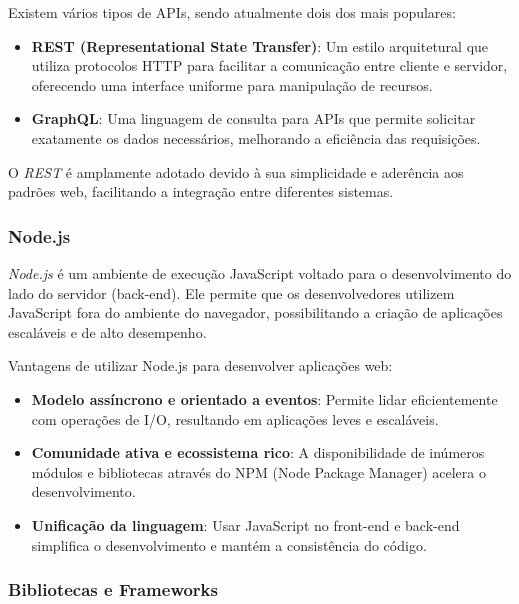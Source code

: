 Existem vários tipos de APIs, sendo atualmente dois dos mais populares:

\begin{itemize}
    \item \textbf{REST (Representational State Transfer)}: Um estilo arquitetural que utiliza protocolos HTTP para facilitar a comunicação entre cliente e servidor, oferecendo uma interface uniforme para manipulação de recursos.
    \item \textbf{GraphQL}: Uma linguagem de consulta para APIs que permite solicitar exatamente os dados necessários, melhorando a eficiência das requisições.
\end{itemize}

O \emph{REST} é amplamente adotado devido à sua simplicidade e aderência aos padrões web, facilitando a integração entre diferentes sistemas.

\subsubsection{Node.js}


\emph{Node.js} é um ambiente de execução JavaScript voltado para o desenvolvimento do lado do servidor (back-end). Ele permite que os desenvolvedores utilizem JavaScript fora do ambiente do navegador, possibilitando a criação de aplicações escaláveis e de alto desempenho.

Vantagens de utilizar Node.js para desenvolver aplicações web:

\begin{itemize}
    \item \textbf{Modelo assíncrono e orientado a eventos}: Permite lidar eficientemente com operações de I/O, resultando em aplicações leves e escaláveis.
    \item \textbf{Comunidade ativa e ecossistema rico}: A disponibilidade de inúmeros módulos e bibliotecas através do NPM (Node Package Manager) acelera o desenvolvimento.
    \item \textbf{Unificação da linguagem}: Usar JavaScript no front-end e back-end simplifica o desenvolvimento e mantém a consistência do código.
\end{itemize}

\subsubsection{Bibliotecas e Frameworks}

